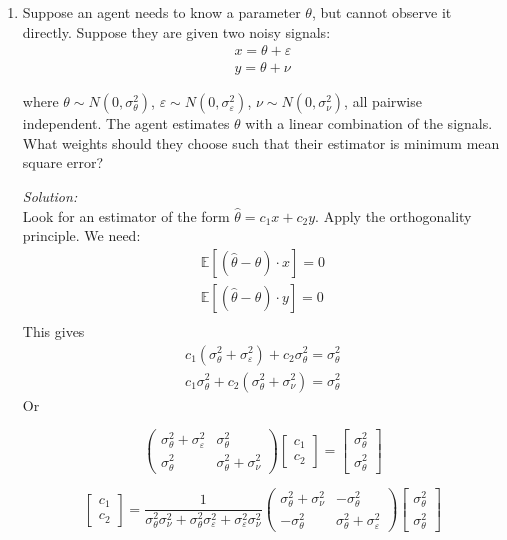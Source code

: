 \documentclass[12pt]{article}
\newif\ifsln
\renewcommand{\epsilon}{\varepsilon}
\newcommand{\E}{\mathbb{E}}
\begin{document}
\begin{enumerate}[1.]

\item Suppose an agent needs to know a parameter $\theta$, but cannot observe it directly. Suppose they are given two noisy signals:
\begin{align*}
x = \theta + \epsilon\\
y = \theta + \nu
\end{align*}

where $\theta \sim N(0, \sigma^{2}_{\theta})$, $\epsilon \sim N(0, \sigma^{2}_{\epsilon})$, $\nu \sim N(0, \sigma^{2}_{\nu})$, all pairwise independent. The agent estimates $\theta$ with a linear combination of the signals. What weights should they choose such that their estimator is minimum mean square error?

\ifsln
\textit{Solution:}\\
Look for an estimator of the form $\hat{\theta} = c_{1}x + c_{2}y$. Apply the orthogonality principle. We need:
\begin{align*}
\E[(\hat{\theta} - \theta)\cdot x] = 0\\
\E[(\hat{\theta} - \theta)\cdot y] = 0\\
\end{align*}
This gives 
\begin{align*}
c_{1} (\sigma^{2}_{\theta} + \sigma^{2}_{\epsilon}) + c_{2} \sigma^{2}_{\theta} = \sigma^{2}_{\theta}\\
c_{1} \sigma^{2}_{\theta} + c_{2}(\sigma^{2}_{\theta} + \sigma^{2}_{\nu}) = \sigma^{2}_{\theta}
\end{align*}
Or

\[\begin{pmatrix} \sigma^{2}_{\theta} + \sigma^{2}_{\epsilon} & \sigma^{2}_{\theta} \\ \sigma^{2}_{\theta} & \sigma^{2}_{\theta} + \sigma^{2}_{\nu}\end{pmatrix} \begin{bmatrix}c_{1}\\c_{2}\end{bmatrix} = \begin{bmatrix}\sigma^{2}_{\theta}\\ \sigma^{2}_{\theta} \end{bmatrix}\]
	
\[\begin{bmatrix}c_{1}\\c_{2}\end{bmatrix} = \frac{1}{\sigma^{2}_{\theta}\sigma^{2}_{\nu} + \sigma^{2}_{\theta}\sigma^{2}_{\epsilon} + \sigma^{2}_{\epsilon}\sigma^{2}_{\nu}}\begin{pmatrix} \sigma^{2}_{\theta} + \sigma^{2}_{\nu} & -\sigma^{2}_{\theta} \\ -\sigma^{2}_{\theta} & \sigma^{2}_{\theta} + \sigma^{2}_{\epsilon}\end{pmatrix}  \begin{bmatrix}\sigma^{2}_{\theta}\\ \sigma^{2}_{\theta} \end{bmatrix}\]


\end{enumerate}
\end{document}

